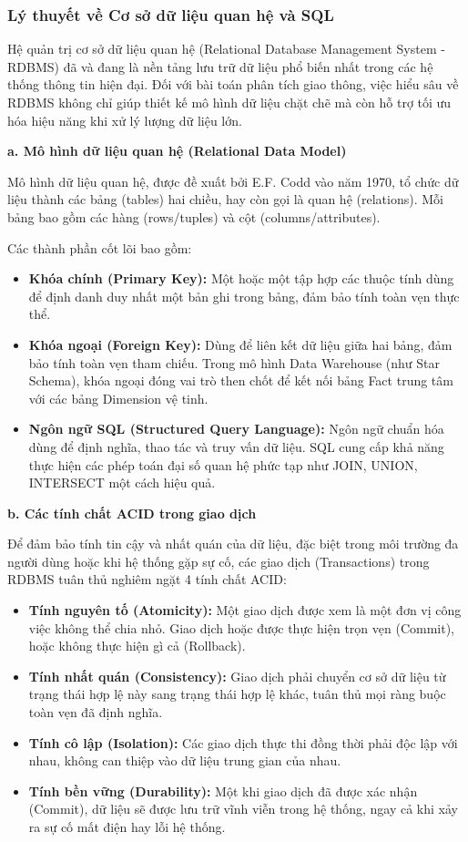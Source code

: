 \subsubsection{Lý thuyết về Cơ sở dữ liệu quan hệ và SQL}

Hệ quản trị cơ sở dữ liệu quan hệ (Relational Database Management System - RDBMS) đã và đang là nền tảng lưu trữ dữ liệu phổ biến nhất trong các hệ thống thông tin hiện đại. Đối với bài toán phân tích giao thông, việc hiểu sâu về RDBMS không chỉ giúp thiết kế mô hình dữ liệu chặt chẽ mà còn hỗ trợ tối ưu hóa hiệu năng khi xử lý lượng dữ liệu lớn.

\textbf{a. Mô hình dữ liệu quan hệ (Relational Data Model)}

Mô hình dữ liệu quan hệ, được đề xuất bởi E.F. Codd vào năm 1970, tổ chức dữ liệu thành các bảng (tables) hai chiều, hay còn gọi là quan hệ (relations). Mỗi bảng bao gồm các hàng (rows/tuples) và cột (columns/attributes).

Các thành phần cốt lõi bao gồm:
\begin{itemize}
    \item \textbf{Khóa chính (Primary Key):} Một hoặc một tập hợp các thuộc tính dùng để định danh duy nhất một bản ghi trong bảng, đảm bảo tính toàn vẹn thực thể.
    \item \textbf{Khóa ngoại (Foreign Key):} Dùng để liên kết dữ liệu giữa hai bảng, đảm bảo tính toàn vẹn tham chiếu. Trong mô hình Data Warehouse (như Star Schema), khóa ngoại đóng vai trò then chốt để kết nối bảng Fact trung tâm với các bảng Dimension vệ tinh.
    \item \textbf{Ngôn ngữ SQL (Structured Query Language):} Ngôn ngữ chuẩn hóa dùng để định nghĩa, thao tác và truy vấn dữ liệu. SQL cung cấp khả năng thực hiện các phép toán đại số quan hệ phức tạp như JOIN, UNION, INTERSECT một cách hiệu quả.
\end{itemize}

\textbf{b. Các tính chất ACID trong giao dịch}

Để đảm bảo tính tin cậy và nhất quán của dữ liệu, đặc biệt trong môi trường đa người dùng hoặc khi hệ thống gặp sự cố, các giao dịch (Transactions) trong RDBMS tuân thủ nghiêm ngặt 4 tính chất ACID:
\begin{itemize}
    \item \textbf{Tính nguyên tố (Atomicity):} Một giao dịch được xem là một đơn vị công việc không thể chia nhỏ. Giao dịch hoặc được thực hiện trọn vẹn (Commit), hoặc không thực hiện gì cả (Rollback).
    \item \textbf{Tính nhất quán (Consistency):} Giao dịch phải chuyển cơ sở dữ liệu từ trạng thái hợp lệ này sang trạng thái hợp lệ khác, tuân thủ mọi ràng buộc toàn vẹn đã định nghĩa.
    \item \textbf{Tính cô lập (Isolation):} Các giao dịch thực thi đồng thời phải độc lập với nhau, không can thiệp vào dữ liệu trung gian của nhau.
    \item \textbf{Tính bền vững (Durability):} Một khi giao dịch đã được xác nhận (Commit), dữ liệu sẽ được lưu trữ vĩnh viễn trong hệ thống, ngay cả khi xảy ra sự cố mất điện hay lỗi hệ thống.
\end{itemize}


